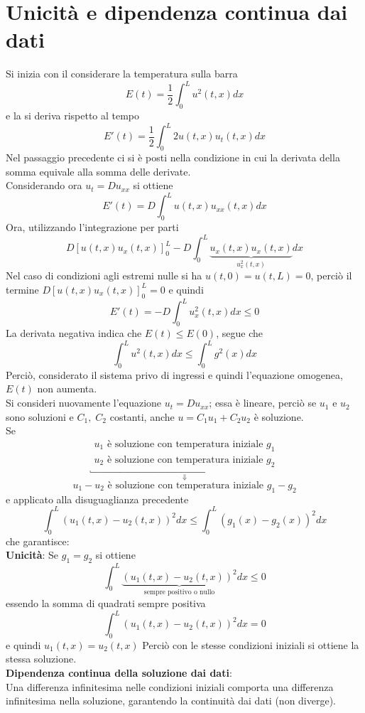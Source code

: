 \section{Unicit\`a e dipendenza continua dai dati}
Si inizia con il considerare la temperatura sulla barra
\[
	E(t)= \frac{1}{2}\int_0^L u^2 (t,x) dx
\]
e la si deriva rispetto al tempo
\[
	E'(t)= \frac{1}{2}\int_0^L 2u(t,x)u_t(t,x)dx
\]
Nel passaggio precedente ci si \`e posti nella condizione in cui la derivata della somma equivale alla somma delle derivate.\\
Considerando ora $u_t=Du_{xx}$ si ottiene
\[
	E'(t)= D\int_0^L u(t,x)u_{xx}(t,x)dx
\]
Ora, utilizzando l'integrazione per parti
\[
	D\left[u(t,x)u_x(t,x)\right]_0^L - D\int_0^L 
	\underbrace{u_x(t,x)u_x(t,x)}_{u_x^2(t,x)}dx
\]
Nel caso di condizioni agli estremi nulle si ha $u(t,0)=u(t,L)=0$, perci\`o il termine $D\left[u(t,x)u_x(t,x)\right]_0^L=0$ e quindi
\[
	E'(t)= - D \int_0^L u_x^2(t,x) dx \leq 0
\]
La derivata negativa indica che $E(t)\leq E(0)$, segue che
\[
	\int_0^L u^2(t,x)dx \leq \int_0^L g^2 (x) dx
\]
Perci\`o, considerato il sistema privo di ingressi e quindi l'equazione
omogenea, $E(t)$ non aumenta. \\
Si consideri nuovamente l'equazione $u_t=Du_{xx}$; essa \`e lineare, perci\`o
se $u_1$ e $u_2$ sono soluzioni e $C_1,\; C_2$ costanti, anche $u=C_1u_1+C_2u_2$ \`e soluzione.\\
Se
\[
	\underbracket{
		\begin{array}{l}
			u_1 \text{ \`e soluzione con temperatura iniziale } g_1 \\
			u_2 \text{ \`e soluzione con temperatura iniziale } g_2
		\end{array}
		}_{\Downarrow}
\]
\[
	u_1-u_2 \text{ \`e soluzione con temperatura iniziale } g_1-g_2
\]
e applicato alla disuguaglianza precedente
\[
	\int_0^L \left(u_1(t,x)-u_2(t,x)\right)^2 dx
	\leq
	\int_0^L \left(g_1(x)-g_2(x)\right)^2 dx
\]
che garantisce:\\
{\bf Unicit\`a}: Se $g_1=g_2$ si ottiene
\[
	\int_0^L \underbrace{\left(u_1(t,x)-u_2(t,x)\right)^2}_\text{sempre positivo o nullo} dx
	\leq 0
\]
essendo la somma di quadrati sempre positiva
\[
	\int_0^L \left(u_1(t,x)-u_2(t,x)\right)^2 dx
	= 0
\]
e quindi $u_1(t,x)=u_2(t,x)$
Perci\`o con le stesse condizioni iniziali si ottiene la stessa soluzione.\\
{\bf Dipendenza continua della soluzione dai dati}:\\
Una differenza infinitesima nelle condizioni iniziali comporta una differenza
infinitesima nella soluzione, garantendo la continuit\`a dai dati (non diverge).

